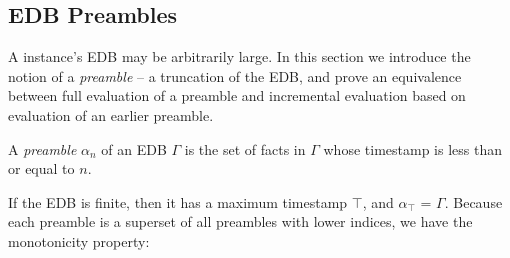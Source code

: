 





\subsection{EDB Preambles}

A \slang instance's EDB may be arbitrarily large.  In this section we introduce
the notion of a {\em preamble} -- a truncation of the EDB, and prove an
equivalence between full evaluation of a preamble and incremental evaluation
based on evaluation of an earlier preamble.


\begin{definition}
A \emph{preamble} $\alpha_{n}$ of an EDB $\Gamma$ is the set of facts in $\Gamma$ whose timestamp is less than or equal to $n$.
\end{definition}

If the EDB is finite, then it has a maximum timestamp $\top$, and
$\alpha_{\top}$ = $\Gamma$.  
Because each preamble is a superset of all preambles with lower indices, we
have the monotonicity property:

